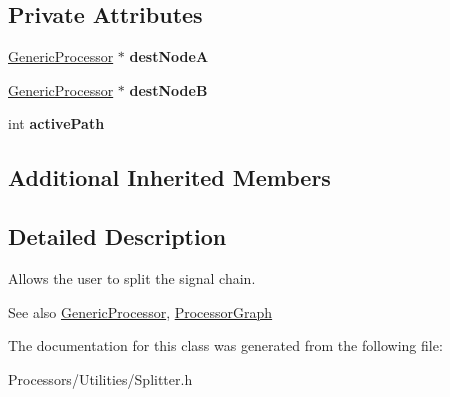 \subsection*{Private Attributes}
\begin{DoxyCompactItemize}
\item 
\hypertarget{classSplitter_a612aa88eafc53648ea6d2f3ef9ce25f7}{\hyperlink{classGenericProcessor}{Generic\-Processor} $\ast$ {\bfseries dest\-Node\-A}}\label{classSplitter_a612aa88eafc53648ea6d2f3ef9ce25f7}

\item 
\hypertarget{classSplitter_a02597536b91e85671fd16edcb8cc16d7}{\hyperlink{classGenericProcessor}{Generic\-Processor} $\ast$ {\bfseries dest\-Node\-B}}\label{classSplitter_a02597536b91e85671fd16edcb8cc16d7}

\item 
\hypertarget{classSplitter_a80a5b64b670adcc887b05f2b3e5f27bf}{int {\bfseries active\-Path}}\label{classSplitter_a80a5b64b670adcc887b05f2b3e5f27bf}

\end{DoxyCompactItemize}
\subsection*{Additional Inherited Members}


\subsection{Detailed Description}
Allows the user to split the signal chain.

\begin{DoxySeeAlso}{See also}
\hyperlink{classGenericProcessor}{Generic\-Processor}, \hyperlink{classProcessorGraph}{Processor\-Graph} 
\end{DoxySeeAlso}


The documentation for this class was generated from the following file\-:\begin{DoxyCompactItemize}
\item 
Processors/\-Utilities/Splitter.\-h\end{DoxyCompactItemize}
